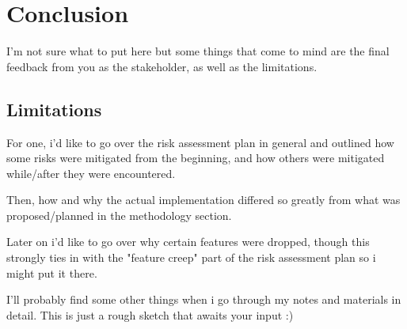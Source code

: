 \chapter{Conclusion}
\label{sec:conclusion}

I'm not sure what to put here but some things that come to mind are the final feedback from you as the stakeholder, as well as the limitations.

\section{Limitations}

For one, i'd like to go over the risk assessment plan in general and outlined how some risks were mitigated from the beginning, and how others were mitigated while/after they were encountered.

Then, how and why the actual implementation differed so greatly from what was proposed/planned in the methodology section.

Later on i'd like to go over why certain features were dropped, though this strongly ties in with the "feature creep" part of the risk assessment plan so i might put it there.

I'll probably find some other things when i go through my notes and materials in detail. This is just a rough sketch that awaits your input :)